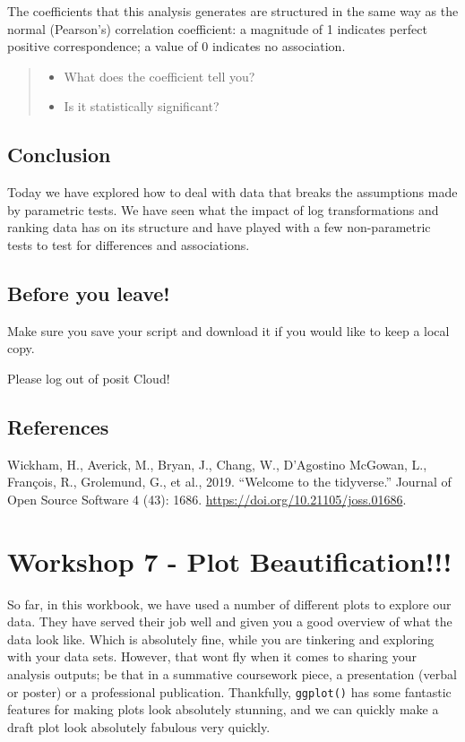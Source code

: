 \documentclass[
]{book}
\providecommand{\tightlist}{%
  \setlength{\itemsep}{0pt}\setlength{\parskip}{0pt}}
\begin{document}
The coefficients that this analysis generates are structured in the same way as the normal (Pearson's) correlation coefficient: a magnitude of 1 indicates perfect positive correspondence; a value of 0 indicates no association.

\begin{quote}
\begin{itemize}
\tightlist
\item
  What does the coefficient tell you?
\item
  Is it statistically significant?
\end{itemize}
\end{quote}

\section{Conclusion}\label{conclusion-5}

Today we have explored how to deal with data that breaks the assumptions made by parametric tests. We have seen what the impact of log transformations and ranking data has on its structure and have played with a few non-parametric tests to test for differences and associations.

\section{Before you leave!}\label{before-you-leave-5}

Make sure you save your script and download it if you would like to keep a local copy.

Please log out of posit Cloud!

\section{References}\label{references-5}

Wickham, H., Averick, M., Bryan, J., Chang, W., D'Agostino McGowan, L., François, R., Grolemund, G., et al., 2019. ``Welcome to the tidyverse.'' Journal of Open Source Software 4 (43): 1686. \url{https://doi.org/10.21105/joss.01686}.

\chapter{Workshop 7 - Plot Beautification!!!}\label{workshop-7---plot-beautification}

So far, in this workbook, we have used a number of different plots to explore our data. They have served their job well and given you a good overview of what the data look like. Which is absolutely fine, while you are tinkering and exploring with your data sets. However, that wont fly when it comes to sharing your analysis outputs; be that in a summative coursework piece, a presentation (verbal or poster) or a professional publication. Thankfully, \texttt{ggplot()} has some fantastic features for making plots look absolutely stunning, and we can quickly make a draft plot look absolutely fabulous very quickly.
\end{document}
